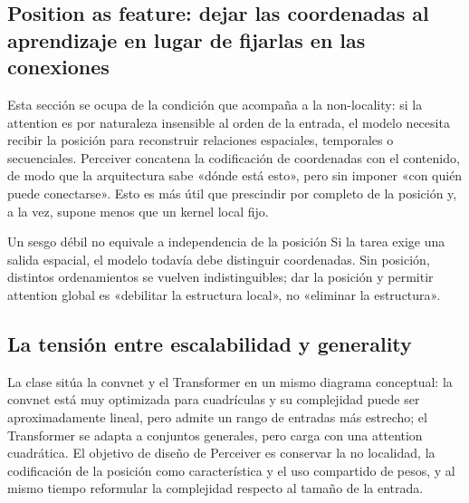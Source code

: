 \subsection{Position as feature: dejar las coordenadas al aprendizaje en lugar de fijarlas en las conexiones}

Esta sección se ocupa de la condición que acompaña a la non-locality: si la attention es por naturaleza insensible al orden de la entrada, el modelo necesita recibir la posición para reconstruir relaciones espaciales, temporales o secuenciales. Perceiver concatena la codificación de coordenadas con el contenido, de modo que la arquitectura sabe «dónde está esto», pero sin imponer «con quién puede conectarse». Esto es más útil que prescindir por completo de la posición y, a la vez, supone menos que un kernel local fijo.


\begin{warningbox}{Un sesgo débil no equivale a independencia de la posición}
Si la tarea exige una salida espacial, el modelo todavía debe distinguir coordenadas. Sin posición, distintos ordenamientos se vuelven indistinguibles; dar la posición y permitir attention global es «debilitar la estructura local», no «eliminar la estructura».
\end{warningbox}

\subsection{La tensión entre escalabilidad y generality}

La clase sitúa la convnet y el Transformer en un mismo diagrama conceptual: la convnet está muy optimizada para cuadrículas y su complejidad puede ser aproximadamente lineal, pero admite un rango de entradas más estrecho; el Transformer se adapta a conjuntos generales, pero carga con una attention cuadrática. El objetivo de diseño de Perceiver es conservar la no localidad, la codificación de la posición como característica y el uso compartido de pesos, y al mismo tiempo reformular la complejidad respecto al tamaño de la entrada.


